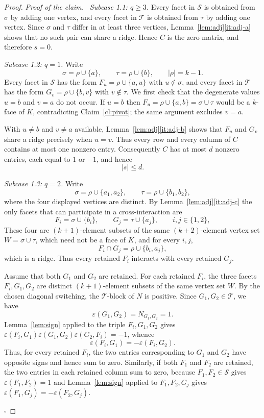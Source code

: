 \documentclass[11pt,reqno]{amsart}
\numberwithin{equation}{section}
\theoremstyle{plain}
\theoremstyle{definition}
\newenvironment{claimproof}
  {\par\smallskip\noindent\textit{Proof of the claim.}\ }
  {\hfill$\square$\par\smallskip}
\newcommand{\eps}{\varepsilon}
\newcommand{\Sset}{\mathcal S}
\newcommand{\Tset}{\mathcal T}
\begin{document}
\begin{proof}
\begin{claimproof}
\smallskip
\noindent\emph{Subcase 1.1: $q\ge3$.} Every facet in $\Sset$ is obtained from $\sigma$ by
adding one vertex, and every facet in $\Tset$ is obtained from $\tau$ by adding one vertex.
Since $\sigma$ and $\tau$ differ in at least three vertices, Lemma~\ref{lem:adj}\ref{it:adj-a}
shows that no such pair can share a ridge. Hence $C$ is the zero matrix, and therefore $s=0$.

\smallskip
\noindent\emph{Subcase 1.2: $q=1$.} Write
\[
  \sigma=\rho\cup\{a\},\qquad \tau=\rho\cup\{b\},\qquad |\rho|=k-1 .
\]
Every facet in $\Sset$ has the form $F_u=\rho\cup\{a,u\}$ with $u\notin\sigma$, and every facet
in $\Tset$ has the form $G_v=\rho\cup\{b,v\}$ with $v\notin\tau$. We first check that the
degenerate values $u=b$ and $v=a$ do not occur. If $u=b$ then $F_u=\rho\cup\{a,b\}=\sigma\cup\tau$
would be a $k$-face of $K$, contradicting Claim~\ref{cl:pivot}; the same argument excludes
$v=a$.

With $u\ne b$ and $v\ne a$ available, Lemma~\ref{lem:adj}\ref{it:adj-b} shows that $F_u$ and
$G_v$ share a ridge precisely when $u=v$. Thus every row and every column of $C$ contains at
most one nonzero entry. Consequently $C$ has at most $d$ nonzero entries, each equal to $1$ or
$-1$, and hence
\[
  |s|\le d .
\]

\smallskip
\noindent\emph{Subcase 1.3: $q=2$.} Write
\[
  \sigma=\rho\cup\{a_1,a_2\},\qquad \tau=\rho\cup\{b_1,b_2\},
\]
where the four displayed vertices are distinct. By Lemma~\ref{lem:adj}\ref{it:adj-c} the only
facets that can participate in a cross-interaction are
\[
  F_i=\sigma\cup\{b_i\},\qquad G_j=\tau\cup\{a_j\},\qquad i,j\in\{1,2\},
\]
These four are $(k+1)$-element subsets of the same $(k+2)$-element vertex set
$W=\sigma\cup\tau$, which need not be a face of $K$, and for every $i,j$,
\[
  F_i\cap G_j=\rho\cup\{b_i,a_j\},
\]
which is a ridge. Thus every retained $F_i$ interacts with every retained $G_j$.

Assume that both $G_1$ and $G_2$ are retained. For each retained $F_i$, the three facets
$F_i,G_1,G_2$ are distinct $(k+1)$-element subsets of the same vertex set $W$. By the chosen
diagonal switching, the $\Tset$-block of $N$ is positive. Since $G_1,G_2\in\Tset$, we have
\[
  \eps(G_1,G_2)=N_{G_1,G_2}=1 .
\]
Lemma~\ref{lem:sign} applied to the triple $F_i,G_1,G_2$ gives
$\eps(F_i,G_1)\eps(G_1,G_2)\eps(G_2,F_i)=-1$, whence
\[
  \eps(F_i,G_1)=-\eps(F_i,G_2) .
\]
Thus, for every retained $F_i$, the two entries corresponding to $G_1$ and $G_2$ have opposite
signs and hence sum to zero. Similarly, if both $F_1$ and $F_2$ are retained, the two entries
in each retained column sum to zero, because $F_1,F_2\in\Sset$ gives
$\eps(F_1,F_2)=1$ and Lemma~\ref{lem:sign} applied to $F_1,F_2,G_j$ gives
$\eps(F_1,G_j)=-\eps(F_2,G_j)$.


\end{claimproof}
\end{proof}
\end{document}
